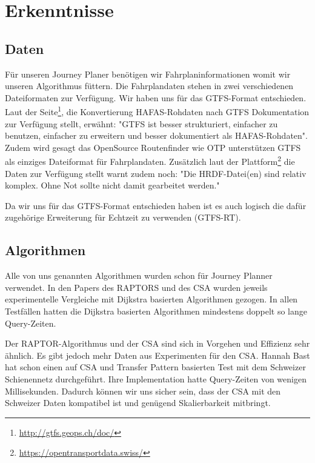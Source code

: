 \section[Erkenntnisse]{Erkenntnisse}
\label{sec:erkenntnisse}

\subsection{Daten}
\label{sec:erkenntnisseDaten}
Für unseren Journey Planer benötigen wir Fahrplaninformationen womit wir unseren Algorithmus füttern. Die Fahrplandaten stehen in zwei verschiedenen Dateiformaten zur Verfügung. 
\newline
\newline
Wir haben uns für das GTFS-Format entschieden.
Laut der Seite\footnote{\url{http://gtfs.geops.ch/doc/}}, die Konvertierung HAFAS-Rohdaten nach GTFS Dokumentation zur Verfügung stellt, erwähnt: "GTFS ist besser strukturiert, einfacher zu benutzen, einfacher zu erweitern und besser dokumentiert als HAFAS-Rohdaten". Zudem wird gesagt das OpenSource Routenfinder wie OTP unterstützen GTFS als einziges Dateiformat für Fahrplandaten.\cite{hrdfintogtfs}
\newline
\newline
Zusätzlich laut der Plattform\footnote{\url{https://opentransportdata.swiss/}} die Daten zur Verfügung stellt warnt zudem noch: "Die HRDF-Datei(en) sind relativ komplex. Ohne Not sollte nicht damit gearbeitet werden."\cite{opentransporthrdf}

Da wir uns für das GTFS-Format entschieden haben ist es auch logisch die dafür zugehörige Erweiterung für Echtzeit zu verwenden (GTFS-RT).



\subsection{Algorithmen}
\label{sec:erkenntnisseAlgorithmen}
Alle von uns genannten Algorithmen wurden schon für Journey Planner verwendet. In den Papers des RAPTORS und des CSA wurden jeweils experimentelle Vergleiche mit Dijkstra basierten Algorithmen gezogen. In allen Testfällen hatten die Dijkstra basierten Algorithmen mindestens doppelt so lange Query-Zeiten. ~\cite{csa} ~\cite{raptor}

Der RAPTOR-Algorithmus und der CSA sind sich in Vorgehen und Effizienz sehr ähnlich. Es gibt jedoch mehr Daten aus Experimenten für den CSA. Hannah Bast hat schon einen auf CSA und Transfer Pattern basierten Test mit dem Schweizer Schienennetz durchgeführt. Ihre Implementation hatte Query-Zeiten von wenigen Millisekunden. Dadurch können wir uns sicher sein, dass der CSA mit den Schweizer Daten kompatibel ist und genügend Skalierbarkeit mitbringt.~\cite{transferpatterns_esa}

